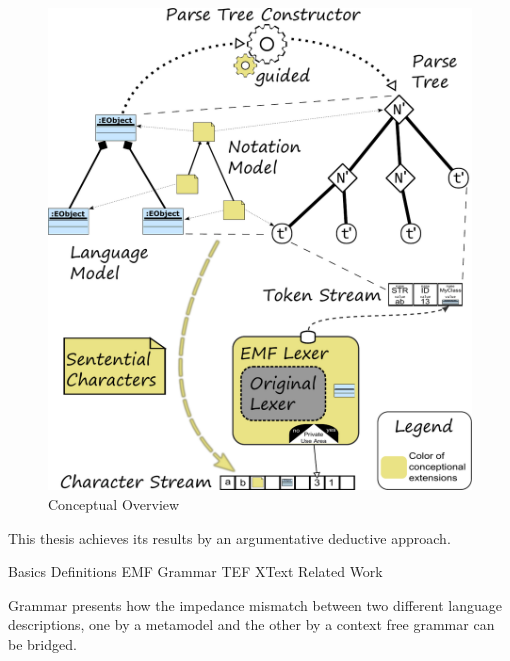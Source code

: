 \begin{figure}
\centering
\includegraphics[scale=0.75]{gfx/ex/Concept} 
\caption{Conceptual Overview}
\label{ConceptFigure}
\end{figure}


This thesis achieves its results by an argumentative deductive approach. 

Basics
Definitions
EMF
Grammar
TEF
XText
Related Work




Grammar presents how the impedance mismatch between two different language descriptions, one by a metamodel and the other by a context free grammar can be bridged. 
